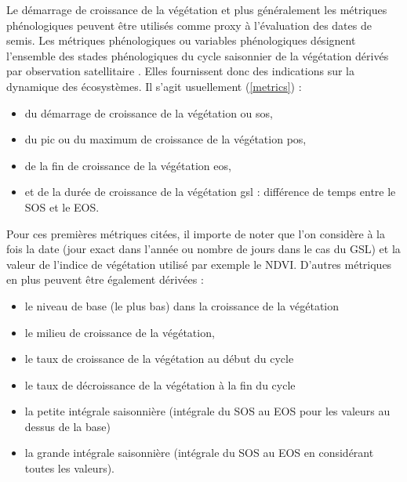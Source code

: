 Le démarrage de croissance de la végétation et plus généralement les métriques phénologiques peuvent être utilisés comme proxy à l'évaluation des dates de semis. Les métriques phénologiques
ou variables phénologiques désignent l'ensemble des stades phénologiques du cycle saisonnier de la végétation dérivés par observation satellitaire \citep{Helman2018}. Elles fournissent 
donc des indications sur la dynamique des écosystèmes.
Il s'agit usuellement (\cref{metrics}) : 
\begin{itemize}
 \item du démarrage de croissance de la végétation ou \acrshort{sos},
 \item du pic ou du maximum de croissance de la végétation \acrshort{pos},
 \item de la fin de croissance de la végétation \acrshort{eos},
 \item et de la durée de croissance de la végétation \acrshort{gsl} : différence de temps entre le SOS et le EOS.
\end{itemize}
Pour ces premières métriques citées, il importe de noter que l'on considère à la fois la date (jour exact dans l'année ou nombre de jours dans le cas du GSL) et la valeur de l'indice de 
végétation utilisé par exemple le NDVI. D'autres métriques en plus peuvent être également dérivées : 
\begin{itemize}
 \item le niveau de base (le plus bas) dans la croissance de la végétation
 \item le milieu de croissance de la végétation,
 \item le taux de croissance de la végétation au début du cycle
 \item le taux de décroissance de la végétation à la fin du cycle
 \item la petite intégrale saisonnière (intégrale du SOS au EOS pour les valeurs au dessus de la base)
 \item la grande intégrale saisonnière (intégrale du SOS au EOS en considérant toutes les valeurs).
\end{itemize}


